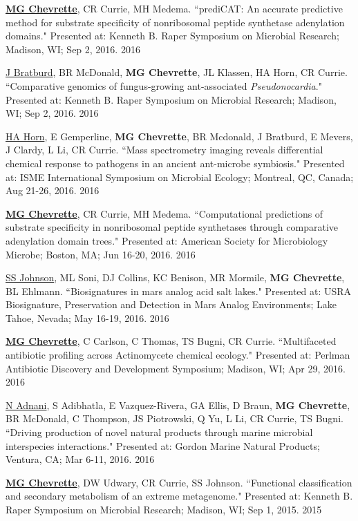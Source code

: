 \begin{cvpubs}
\cvpub
{\textbf{\underline{MG Chevrette}}, CR Currie, MH Medema.  ``prediCAT: An accurate predictive method for substrate specificity of nonribosomal peptide synthetase adenylation domains." Presented at: Kenneth B. Raper Symposium on Microbial Research; Madison, WI; Sep 2, 2016.}
{2016}

\cvpub
{\underline{J Bratburd}, BR McDonald, \textbf{MG Chevrette}, JL Klassen, HA Horn, CR Currie. ``Comparative genomics of fungus-growing ant-associated \textit{Pseudonocardia}." Presented at: Kenneth B. Raper Symposium on Microbial Research; Madison, WI; Sep 2, 2016.}
{2016}

\cvpub
{\underline{HA Horn}, E Gemperline, \textbf{MG Chevrette}, BR Mcdonald, J Bratburd, E Mevers, J Clardy, L Li, CR Currie. ``Mass spectrometry imaging reveals differential chemical response to pathogens in an ancient ant-microbe symbiosis." Presented at: ISME International Symposium on Microbial Ecology; Montreal, QC, Canada; Aug 21-26, 2016.}
{2016}

\cvpub
{\textbf{\underline{MG Chevrette}}, CR Currie, MH Medema.  ``Computational predictions of substrate specificity in nonribosomal peptide synthetases through comparative adenylation domain trees." Presented at: American Society for Microbiology Microbe; Boston, MA; Jun 16-20, 2016.}
{2016}

\cvpub
{\underline{SS Johnson}, ML Soni, DJ Collins, KC Benison, MR Mormile, \textbf{MG Chevrette}, BL Ehlmann. ``Biosignatures in mars analog acid salt lakes." Presented at: USRA Biosignature, Preservation and Detection in Mars Analog Environments; Lake Tahoe, Nevada; May 16-19, 2016.}
{2016}

\cvpub
{\textbf{\underline{MG Chevrette}}, C Carlson, C Thomas, TS Bugni, CR Currie. ``Multifaceted antibiotic profiling across Actinomycete chemical ecology." Presented at: Perlman Antibiotic Discovery and Development Symposium; Madison, WI; Apr 29, 2016.}
{2016}

\cvpub
{\underline{N Adnani}, S Adibhatla, E Vazquez-Rivera, GA Ellis, D Braun, \textbf{MG Chevrette}, BR McDonald, C Thompson, JS Piotrowski, Q Yu, L Li, CR Currie, TS Bugni. ``Driving production of novel natural products through marine microbial interspecies interactions." Presented at: Gordon Marine Natural Products; Ventura, CA; Mar 6-11, 2016.}
{2016}

\cvpub
{\textbf{\underline{MG Chevrette}}, DW Udwary, CR Currie, SS Johnson. ``Functional classification and secondary metabolism of an extreme metagenome." Presented at: Kenneth B. Raper Symposium on Microbial Research; Madison, WI; Sep 1, 2015.}
{2015}


\end{cvpubs}
